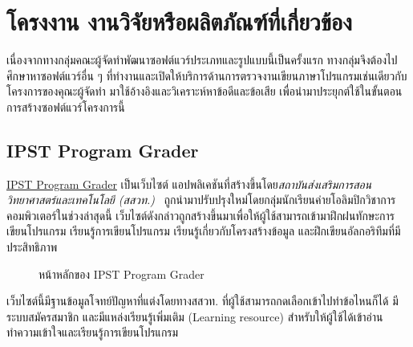\documentclass[12pt,one side,openright,a4paper]{cpe-thesis-th}
\newcommand{\thaijustify}[1]{%
  \par\hspace{30pt}\justifying
  #1
}
\begin{document}
\section{โครงงาน งานวิจัยหรือผลิตภัณฑ์ที่เกี่ยวข้อง}
เนื่องจากทางกลุ่มคณะผู้จัดทำพัฒนาซอฟต์แวร์ประเภทและรูปแบบนี้เป็นครั้งแรก ทางกลุ่มจึงต้องไปศึกษาหาซอฟต์แวร์อื่น ๆ ที่ทำงานและเปิดให้บริการด้านการตรวจงานเขียนภาษาโปรแกรมเช่นเดียวกับโครงการของคุณะผู้จัดทำ มาใช้อ้างอิงและวิเคราะห์หาข้อดีและข้อเสีย เพื่อนำมาประยุกต์ใช้ในขั้นตอนการสร้างซอฟต์แวร์โครงการนี้
\subsection{IPST Program Grader}
\thaijustify{
  \href{https://programming.in.th}{IPST Program Grader} เป็นเว็บไซต์ แอปพลิเคชันที่สร้างขึ้นโดย\textit{สถาบันส่งเสริมการสอนวิทยาศาสตร์และเทคโนโลยี (สสวท.)}~\cite{ipstGrader} ถูกนำมาปรับปรุงใหม่โดยกลุ่มนักเรียนค่ายโอลิมปิกวิชาการคอมพิวเตอร์ในช่วงล่าสุดนี้ เว็บไซต์ดังกล่าวถูกสร้างขึ้นมาเพื่อให้ผู้ใช้สามารถเข้ามาฝึกฝนทักษะการเขียนโปรแกรม เรียนรู้การเขียนโปรแกรม เรียนรู้เกี่ยวกับโครงสร้างข้อมูล และฝึกเขียนอัลกอริทึมที่มีประสิทธิภาพ
}
\begin{figure}[H]
  \centering
  \caption[หน้าหลักของ IPST Program Grader]{หน้าหลักของ IPST Program Grader}
  \label{fig:ipst-page}
\end{figure}
\thaijustify{
  เว็บไซต์นี้มีฐานข้อมูลโจทย์ปัญหาที่แต่งโดยทางสสวท. ที่ผู้ใช้สามารถกดเลือกเข้าไปทำข้อไหนก็ได้ มีระบบสมัครสมาชิก และมีแหล่งเรียนรู้เพิ่มเติม (Learning resource) สำหรับให้ผู้ใช้ได้เข้าอ่านทำความเข้าใจและเรียนรู้การเขียนโปรแกรม
}
\end{document}
